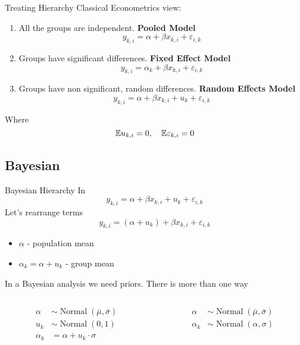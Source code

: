 \documentclass{beamer}
\begin{document}
\begin{frame}{Treating Hierarchy}
Classical Econometrics view:
    \begin{enumerate}
        \item All the groups are independent. \textbf{Pooled Model}
\begin{equation*}
    y_{k,i} = \alpha + \beta x_{k,i} + \varepsilon_{i,k}
\end{equation*}
        \item Groups have significant differences. \textbf{Fixed Effect Model}
\begin{equation*}
    y_{k,i} = \alpha_{k} + \beta x_{k,i} + \varepsilon_{i,k}
\end{equation*}
        \item Groups have non significant, random differences. \textbf{Random Effects Model}
\begin{equation*}
    y_{k,i} = \alpha + \beta x_{k,i} + u_{k} + \varepsilon_{i,k}
\end{equation*}
    \end{enumerate}
Where
\begin{equation*}
    \mathbb{E} u_{k,i} = 0,\quad \mathbb{E} \varepsilon_{k,i} = 0
\end{equation*}
\end{frame}
\subsection{Bayesian}
\begin{frame}{Bayesian Hierarchy}
In
\begin{equation*}
    y_{k,i} = \alpha + \beta x_{k,i} + u_{k} + \varepsilon_{i,k}
\end{equation*}
Let's rearrange terms
\begin{equation*}
    y_{k,i} = (\alpha + u_{k}) + \beta x_{k,i} + \varepsilon_{i,k}
\end{equation*}
\begin{itemize}
    \item $\alpha$ - population mean
    \item $\alpha_k = \alpha + u_k$ - group mean
\end{itemize}
In a Bayesian analysis we need priors. There is more than one way
\begin{columns}
\begin{column}{0.5\linewidth}
\begin{align*}
    \alpha &\sim \operatorname{Normal}(\bar\mu, \bar\sigma)\\
    u_k &\sim \operatorname{Normal}(0, 1)\\
    \alpha_k & = \alpha + u_k \cdot \sigma
\end{align*}
\end{column}
\begin{column}{0.5\linewidth}
\begin{align*}
    \alpha &\sim \operatorname{Normal}(\bar\mu, \bar\sigma)\\
    \alpha_k &\sim \operatorname{Normal}(\alpha, \sigma)
\end{align*}
\end{column}
\end{columns}
\end{frame}
\end{document}
